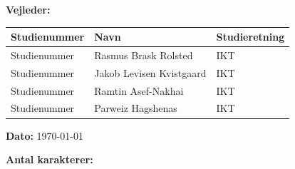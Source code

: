 \begin{center}
	\ifdefined\frontpageSupervisor
	\textbf{Vejleder:} \frontpageSupervisor\\
	\fi
	\vspace{5pt}
	\begin{tabular}{|l|l|l|}
		\hline
		\rowcolor{blue!25}
		\textbf{Studienummer} & \textbf{Navn} & \textbf{Studieretning} \\ [2pt]
		\hline
		Studienummer & Rasmus Brask Rolsted & IKT \\
		\hline
		Studienummer & Jakob Levisen Kvistgaard & IKT \\
		\hline
		Studienummer & Ramtin Asef-Nakhai & IKT \\
		\hline
		Studienummer & Parweiz Hagshenas & IKT \\
		\hline
	\end{tabular}

	{\fontsize{10pt}{0}\selectfont
		\textbf{Dato: } \today\\
	}
	\vspace{5pt}
	
	\ifdefined\frontpageCharacters
		\textbf{Antal karakterer: } \frontpageCharacters\\
	\fi
	\vspace{30pt}

\end{center}

